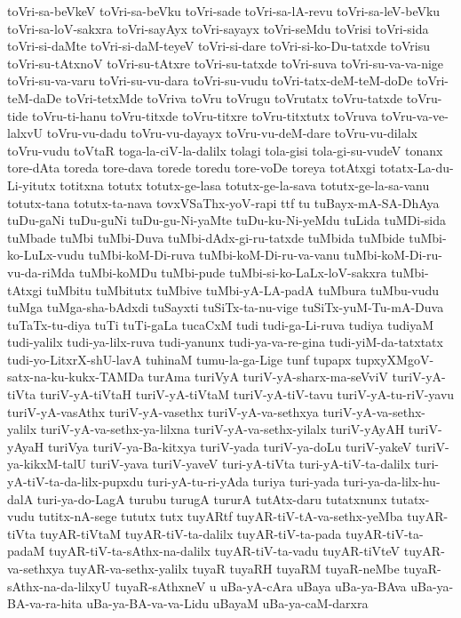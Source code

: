 {toVri-sa-beVkeV
toVri-sa-beVku
toVri-sade
toVri-sa-lA-revu
toVri-sa-leV-beVku
toVri-sa-loV-sakxra
toVri-sayAyx
toVri-sayayx
toVri-seMdu
toVrisi
toVri-sida
toVri-si-daMte
toVri-si-daM-teyeV
toVri-si-dare
toVri-si-ko-Du-tatxde
toVrisu
toVri-su-tAtxnoV
toVri-su-tAtxre
toVri-su-tatxde
toVri-suva
toVri-su-va-va-nige
toVri-su-va-varu
toVri-su-vu-dara
toVri-su-vudu
toVri-tatx-deM-teM-doDe
toVri-teM-daDe
toVri-tetxMde
toVriva
toVru
toVrugu
toVrutatx
toVru-tatxde
toVru-tide
toVru-ti-hanu
toVru-titxde
toVru-titxre
toVru-titxtutx
toVruva
toVru-va-ve-lalxvU
toVru-vu-dadu
toVru-vu-dayayx
toVru-vu-deM-dare
toVru-vu-dilalx
toVru-vudu
toVtaR
toga-la-ciV-la-dalilx
tolagi
tola-gisi
tola-gi-su-vudeV
tonanx
tore-dAta
toreda
tore-dava
torede
toredu
tore-voDe
toreya
totAtxgi
totatx-La-du-Li-yitutx
totitxna
totutx
totutx-ge-lasa
totutx-ge-la-sava
totutx-ge-la-sa-vanu
totutx-tana
totutx-ta-nava
tovxVSaThx-yoV-rapi
ttf
tu
tuBayx-mA-SA-DhAya
tuDu-gaNi
tuDu-guNi
tuDu-gu-Ni-yaMte
tuDu-ku-Ni-yeMdu
tuLida
tuMDi-sida
tuMbade
tuMbi
tuMbi-Duva
tuMbi-dAdx-gi-ru-tatxde
tuMbida
tuMbide
tuMbi-ko-LuLx-vudu
tuMbi-koM-Di-ruva
tuMbi-koM-Di-ru-va-vanu
tuMbi-koM-Di-ru-vu-da-riMda
tuMbi-koMDu
tuMbi-pude
tuMbi-si-ko-LaLx-loV-sakxra
tuMbi-tAtxgi
tuMbitu
tuMbitutx
tuMbive
tuMbi-yA-LA-padA
tuMbura
tuMbu-vudu
tuMga
tuMga-sha-bAdxdi
tuSayxti
tuSiTx-ta-nu-vige
tuSiTx-yuM-Tu-mA-Duva
tuTaTx-tu-diya
tuTi
tuTi-gaLa
tucaCxM
tudi
tudi-ga-Li-ruva
tudiya
tudiyaM
tudi-yalilx
tudi-ya-lilx-ruva
tudi-yanunx
tudi-ya-va-re-gina
tudi-yiM-da-tatxtatx
tudi-yo-LitxrX-shU-lavA
tuhinaM
tumu-la-ga-Lige
tunf
tupapx
tupxyXMgoV-satx-na-ku-kukx-TAMDa
turAma
turiVyA
turiV-yA-sharx-ma-seVviV
turiV-yA-tiVta
turiV-yA-tiVtaH
turiV-yA-tiVtaM
turiV-yA-tiV-tavu
turiV-yA-tu-riV-yavu
turiV-yA-vasAthx
turiV-yA-vasethx
turiV-yA-va-sethxya
turiV-yA-va-sethx-yalilx
turiV-yA-va-sethx-ya-lilxna
turiV-yA-va-sethx-yilalx
turiV-yAyAH
turiV-yAyaH
turiVya
turiV-ya-Ba-kitxya
turiV-yada
turiV-ya-doLu
turiV-yakeV
turiV-ya-kikxM-talU
turiV-yava
turiV-yaveV
turi-yA-tiVta
turi-yA-tiV-ta-dalilx
turi-yA-tiV-ta-da-lilx-pupxdu
turi-yA-tu-ri-yAda
turiya
turi-yada
turi-ya-da-lilx-hu-dalA
turi-ya-do-LagA
turubu
turugA
tururA
tutAtx-daru
tutatxnunx
tutatx-vudu
tutitx-nA-sege
tututx
tutx
tuyARtf
tuyAR-tiV-tA-va-sethx-yeMba
tuyAR-tiVta
tuyAR-tiVtaM
tuyAR-tiV-ta-dalilx
tuyAR-tiV-ta-pada
tuyAR-tiV-ta-padaM
tuyAR-tiV-ta-sAthx-na-dalilx
tuyAR-tiV-ta-vadu
tuyAR-tiVteV
tuyAR-va-sethxya
tuyAR-va-sethx-yalilx
tuyaR
tuyaRH
tuyaRM
tuyaR-neMbe
tuyaR-sAthx-na-da-lilxyU
tuyaR-sAthxneV
u
uBa-yA-cAra
uBaya
uBa-ya-BAva
uBa-ya-BA-va-ra-hita
uBa-ya-BA-va-va-Lidu
uBayaM
uBa-ya-caM-darxra
}
